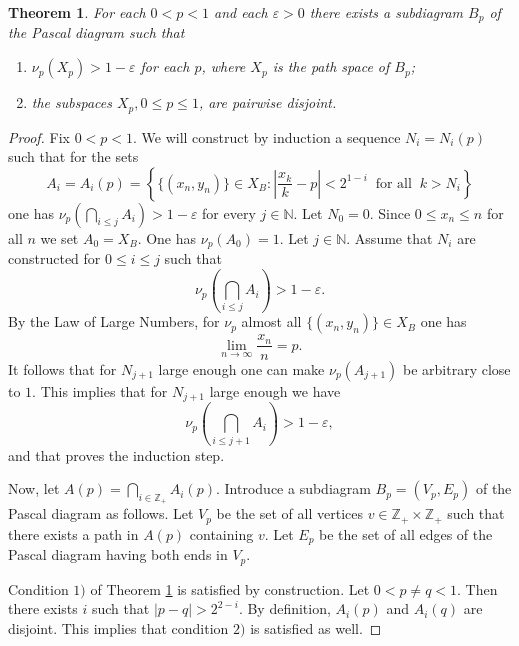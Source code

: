 \documentclass[11pt, twoside]{amsart}
\theoremstyle{definition}
\theoremstyle{remark}
\theoremstyle{plain}
\newtheorem{thm}[definition]{Theorem}
\numberwithin{equation}{section}
\begin{document}
\begin{thm}\label{thm: measure supports}
For each $0 < p < 1$ and each $\varepsilon > 0$ there exists a subdiagram $B_p$  of the Pascal diagram such that 
\begin{enumerate} \item[$1)$] 
$\nu_p(X_p) > 1 - \varepsilon$ for each $p$, where $X_p$ is the path space of $B_p$; 
\item[$2)$] the subspaces $X_p,0\leqslant p\leqslant 1$, are pairwise disjoint.
\end{enumerate}
\end{thm}
\begin{proof} 

Fix $0<p<1$. We will construct by induction a sequence $N_i=N_i(p)$ such that for the sets 
$$A_i=A_i(p)=\left\{\{(x_n,y_n)\}\in X_B:\left|\frac{x_k}{k} -p\right|<2^{1-i}\;\;\text{for all}\;\;k > N_i\right\}$$ 
one has  $\nu_p(\bigcap_{i\leqslant j}A_i)>1 - \varepsilon$ for every $j\in\mathbb N$. Let $N_0=0$.
\vskip 0.1cm
 Since $0\leqslant x_n\leqslant n$ for all $n$ we set $A_0=X_B$. One has $\nu_p(A_0)=1.$
\vskip 0.1cm
 Let $j\in\mathbb N$. Assume that $N_i$ are constructed for $0\leqslant i\leqslant j$ such that 
$$
\nu_p\left(\bigcap_{i\leqslant j}A_i\right) > 1 - \varepsilon.
$$ 
By the Law of Large Numbers, for $\nu_p$ almost all $\{(x_n,y_n)\}\in X_B$ one has 
$$
\lim_{n \rightarrow \infty} \frac{x_n}{n} = p.
$$ 
It follows that for $N_{j+1}$ large enough one can make $\nu_p(A_{j+1})$ be arbitrary close to $1$. This implies that for $N_{j+1}$ large enough we have
$$\nu_p\left(\bigcap_{i\leqslant j+1}A_i\right)
> 1 - \varepsilon,
$$
and that proves the induction step.

Now, let $A(p)=\bigcap_{i\in\mathbb Z_+}A_i(p)$. Introduce a subdiagram $B_p=(V_p,E_p)$ of the Pascal diagram as follows. Let $V_p$ be the set of all vertices $v\in \mathbb Z_+\times\mathbb Z_+$ such that there exists a path in $A(p)$ containing $v$. Let $E_p$ be the set of all edges of the Pascal diagram having both ends in $V_p$. 

Condition $1)$ of Theorem \ref{thm: measure supports} is satisfied by construction. Let $0 < p\neq q < 1$. Then there exists $i$ such that $|p-q|>2^{2-i}$. By definition, $A_i(p)$ and $A_i(q)$ are disjoint. This implies that condition $2)$ is satisfied as well.
\end{proof}
\end{document}
